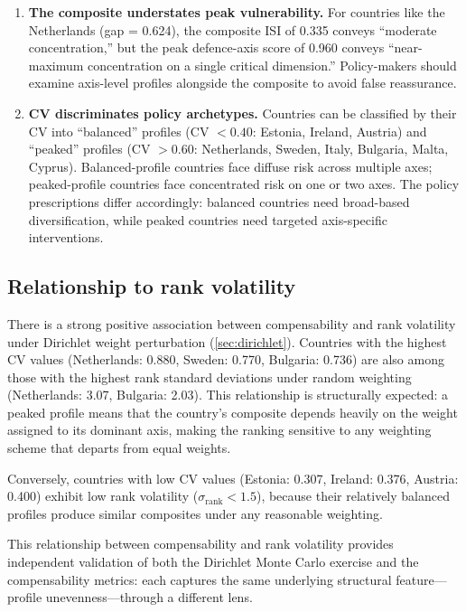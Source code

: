 \begin{enumerate}[leftmargin=2em]
  \item \textbf{The composite understates peak vulnerability.}
    For countries like the Netherlands (gap = 0.624), the composite
    ISI of 0.335 conveys ``moderate concentration,'' but the peak
    defence-axis score of 0.960 conveys ``near-maximum concentration
    on a single critical dimension.''  Policy-makers should examine
    axis-level profiles alongside the composite to avoid false
    reassurance.

  \item \textbf{CV discriminates policy archetypes.}  Countries can
    be classified by their CV into ``balanced'' profiles
    (CV $< 0.40$: Estonia, Ireland, Austria) and ``peaked'' profiles
    (CV $> 0.60$: Netherlands, Sweden, Italy, Bulgaria, Malta,
    Cyprus).  Balanced-profile countries face diffuse risk across
    multiple axes; peaked-profile countries face concentrated risk
    on one or two axes.  The policy prescriptions differ accordingly:
    balanced countries need broad-based diversification, while peaked
    countries need targeted axis-specific interventions.
\end{enumerate}

\subsection{Relationship to rank volatility}

There is a strong positive association between compensability and
rank volatility under Dirichlet weight perturbation
(\cref{sec:dirichlet}).  Countries with the highest CV values
(Netherlands: 0.880, Sweden: 0.770, Bulgaria: 0.736) are also among
those with the highest rank standard deviations under random
weighting (Netherlands: 3.07, Bulgaria: 2.03).  This relationship is structurally expected:
a peaked profile means that the country's composite depends heavily
on the weight assigned to its dominant axis, making the ranking
sensitive to any weighting scheme that departs from equal weights.

Conversely, countries with low CV values (Estonia: 0.307, Ireland:
0.376, Austria: 0.400) exhibit low rank volatility
($\sigma_{\text{rank}} < 1.5$), because their relatively balanced
profiles produce similar composites under any reasonable weighting.

This relationship between compensability and rank volatility provides
independent validation of both the Dirichlet Monte Carlo exercise
and the compensability metrics: each captures the same underlying
structural feature---profile unevenness---through a different lens.
